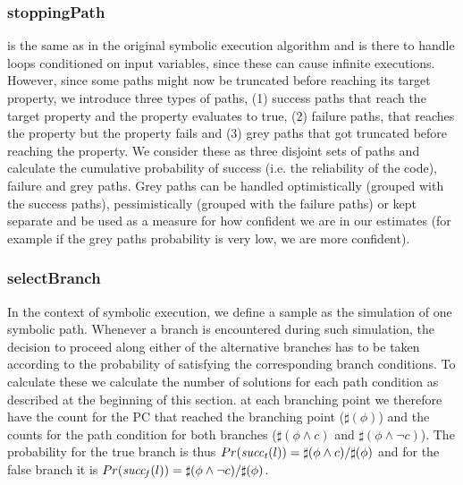 \subsubsection{stoppingPath} is the same as in the original symbolic execution algorithm and is there to handle loops conditioned on input variables, since these can cause infinite executions. However, since some paths might now be truncated before reaching its target property, we introduce three types of paths, (1) success paths that reach the target property and the property evaluates to true, (2) failure paths, that reaches the property but the property fails and  (3) grey paths that got truncated before reaching the property. We consider these as three disjoint sets of paths and calculate the cumulative probability of success (i.e. the reliability of the code), failure and grey paths.  Grey paths can be handled optimistically (grouped with the success paths), pessimistically (grouped with the failure paths) or kept separate and be used as a measure for how confident we are in our estimates (for example if the grey paths probability is very low, we are more confident). 

\subsubsection{selectBranch}  In the context of symbolic execution, we define a sample as the
simulation of one symbolic path. Whenever a branch is encountered during such simulation, the decision to proceed along either of the alternative branches has to be taken according to the probability
of satisfying the corresponding branch conditions. To calculate these we calculate the number of solutions for each path condition as described at the beginning of this section. at each branching point we therefore have the count for the PC that reached the branching point ($\sharp(\phi)$) and the counts for the path condition for both branches ($\sharp(\phi \wedge c)$ and $\sharp(\phi \wedge \neg c)$). The probability for the true branch is thus $Pr(\mathit{succ_t}(l)) = \sharp(\phi \wedge c)/\sharp(\phi)$ and for the false branch it is $Pr(\mathit{succ_f}(l)) = \sharp(\phi \wedge \neg c)/\sharp(\phi)$.  



